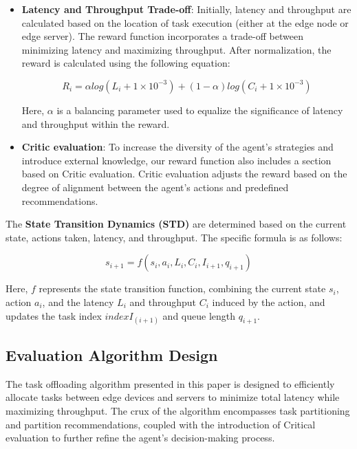 \documentclass[preprint,12pt,authoryear]{elsarticle}
\begin{document}
\begin{itemize}

    \item {\fontsize{11}{\baselineskip}\selectfont \textbf{Latency and Throughput Trade-off}}: Initially, latency and throughput are calculated based on the location of task execution (either at the edge node or edge server). The reward function incorporates a trade-off between minimizing latency and maximizing throughput. After normalization, the reward is calculated using the following equation:

        \begin{equation}
            R_i=\alpha log(L_i+1\times 10^{-3})+(1-\alpha)log(C_i+1\times 10^{-3})
        \end{equation}

    Here, \(\alpha\) is a balancing parameter used to equalize the significance of latency and throughput within the reward.

    \item {\fontsize{11}{\baselineskip}\selectfont \textbf{Critic evaluation}}: To increase the diversity of the agent's strategies and introduce external knowledge, our reward function also includes a section based on Critic evaluation. Critic evaluation adjusts the reward based on the degree of alignment between the agent's actions and predefined recommendations.

\end{itemize}

The \textbf{State Transition Dynamics (STD)}  are determined based on the current state, actions taken, latency, and throughput. The specific formula is as follows:

\begin{equation}
        s_{i+1}=f(s_i,a_i,L_i,C_i,I_{i+1},q_{i+1})
    \end{equation}

Here, \(f\) represents the state transition function, combining the current state \(s_i\), action \(a_i\), and the latency \(L_i\) and throughput \(C_i\) induced by the action, and updates the task index \(indexI_(i+1)\) and queue length \(q_{i+1}\).

\subsection{Evaluation Algorithm Design}

The task offloading algorithm presented in this paper is designed to efficiently allocate tasks between edge devices and servers to minimize total latency while maximizing throughput. The crux of the algorithm encompasses task partitioning and partition recommendations, coupled with the introduction of Critical evaluation to further refine the agent's decision-making process.
\end{document}

